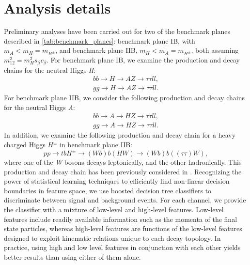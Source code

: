 {\section{Analysis details}
Preliminary analyses have been carried out for two of the benchmark planes described in \autoref{tab:benchmark_planes}: benchmark plane IB, with $m_A < m_H = m_{H^\pm}$, and benchmark plane IIB, $m_H < m_A = m_{H^\pm}$, both assuming $m_{12}^2 = m_H^2s_\beta c_\beta$. For benchmark plane IB, we examine the production and decay chains for the neutral Higgs \emph{H}:
\begin{align*}
  bb\rightarrow H\rightarrow AZ\rightarrow \tau\tau ll,\\
  gg\rightarrow H\rightarrow AZ\rightarrow \tau\tau ll.
\end{align*}
For benchmark plane IIB, we consider the following production and decay chains for the neutral Higgs \emph{A}:
\begin{align*}
  bb\rightarrow A\rightarrow HZ\rightarrow \tau\tau ll,\\
  gg\rightarrow A\rightarrow HZ\rightarrow \tau\tau ll.
\end{align*}
In addition, we examine the following production and decay chain for a heavy charged Higgs $H^\pm$ in benchmark plane IIB:
\[pp\rightarrow tbH^\pm\rightarrow (Wb)b(HW)\rightarrow (Wb)b((\tau\tau)W),\]
where one of the \emph{W} bosons decays leptonically, and the other hadronically. This production and decay chain has been previously considered in \cite{Coleppa2014a}.
Recognizing the power of statistical learning techniques to efficiently find non-linear decision boundaries in feature space, we use boosted decision tree classifiers to discriminate between signal and background events. For each channel, we provide the classifier with a mixture of low-level and high-level features. Low-level features include readily available information such as the momenta of the final state particles, whereas high-level features are functions of the low-level features designed to exploit kinematic relations unique to each decay topology. In practice, using high and low level features in conjunction with each other yields better results than using either of them alone.

}
